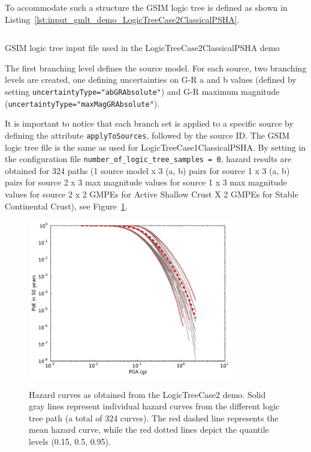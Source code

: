 To accommodate such a structure the GSIM logic tree is defined as shown in
Listing~\ref{lst:input_gmlt_demo_LogicTreeCase2ClassicalPSHA}.

\begin{listing}[htbp]
  \inputminted[firstline=1,firstnumber=1,fontsize=\footnotesize,frame=single,linenos,bgcolor=lightgray]{xml}{oqum/hazard/verbatim/input_gmlt_demo_LogicTreeCase2ClassicalPSHA.xml}
  \caption{GSIM logic tree input file used in the LogicTreeCase2ClassicalPSHA demo}
  \label{lst:input_gmlt_demo_LogicTreeCase2ClassicalPSHA}
\end{listing}

The first branching level defines the source model. For each source, two
branching levels are created, one defining uncertainties on G-R a and b values
(defined by setting \texttt{uncertaintyType="abGRAbsolute"}) and G-R maximum
magnitude (\texttt{uncertaintyType="maxMagGRAbsolute"}).

It is important to notice that each branch set is applied to a specific source
by defining the attribute \texttt{apply\-To\-Sources}, followed by the source
ID. The GSIM logic tree file is the same as used for
LogicTreeCase1ClassicalPSHA. By setting in the configuration file
\texttt{number\_\-of\_\-logic\_\-tree\_\-samples = 0}, hazard results are
obtained for 324 paths (1 source model x 3 (a, b) pairs for source 1 x 3 (a,
b) pairs for source 2 x 3 max magnitude values for source 1 x 3 max magnitude
values for source 2 x 2 GMPEs for Active Shallow Crust X 2 GMPEs for Stable
Continental Crust), see Figure~\ref{fig:hazard_curves}.


\begin{figure}
\centering
\subcaptionbox{}
{\includegraphics[width=9cm]{figures/hazard/hazard-curves-ltcase2.pdf}} 
\caption{Hazard curves as obtained from the LogicTreeCase2 demo. Solid gray 
    lines represent individual hazard curves from the different
    logic tree path (a total of 324 curves). The red dashed line represents the
    mean hazard curve, while the red dotted lines depict the quantile levels
    (0.15, 0.5, 0.95).}
\label{fig:hazard_curves}
\end{figure}

